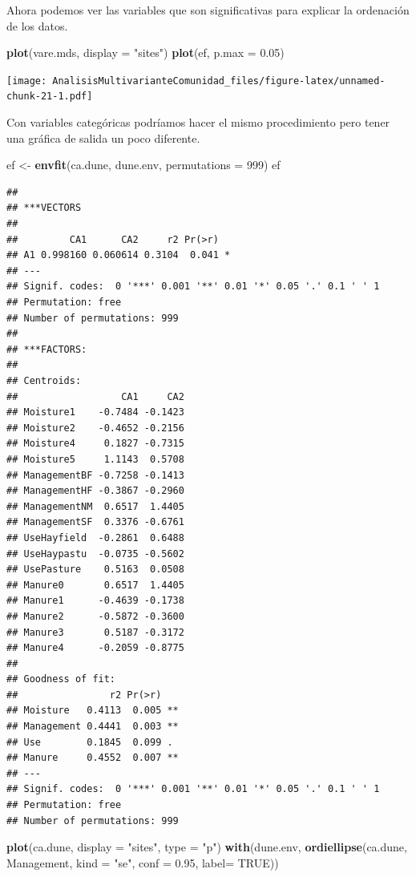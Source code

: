 \documentclass[]{book}
\newenvironment{Shaded}{\begin{snugshade}}{\end{snugshade}}
\newcommand{\KeywordTok}[1]{\textcolor[rgb]{0.13,0.29,0.53}{\textbf{{#1}}}}
\newcommand{\DataTypeTok}[1]{\textcolor[rgb]{0.13,0.29,0.53}{{#1}}}
\newcommand{\DecValTok}[1]{\textcolor[rgb]{0.00,0.00,0.81}{{#1}}}
\newcommand{\FloatTok}[1]{\textcolor[rgb]{0.00,0.00,0.81}{{#1}}}
\newcommand{\StringTok}[1]{\textcolor[rgb]{0.31,0.60,0.02}{{#1}}}
\newcommand{\OtherTok}[1]{\textcolor[rgb]{0.56,0.35,0.01}{{#1}}}
\newcommand{\NormalTok}[1]{{#1}}
\begin{document}
Ahora podemos ver las variables que son significativas para explicar la
ordenación de los datos.

\begin{Shaded}
\begin{Highlighting}[]
\KeywordTok{plot}\NormalTok{(vare.mds, }\DataTypeTok{display =} \StringTok{"sites"}\NormalTok{)}
\KeywordTok{plot}\NormalTok{(ef, }\DataTypeTok{p.max =} \FloatTok{0.05}\NormalTok{)}
\end{Highlighting}
\end{Shaded}

\texttt{[image: AnalisisMultivarianteComunidad\_files/figure-latex/unnamed-chunk-21-1.pdf]}

Con variables categóricas podríamos hacer el mismo procedimiento pero
tener una gráfica de salida un poco diferente.

\begin{Shaded}
\begin{Highlighting}[]
\NormalTok{ef <-}\StringTok{ }\KeywordTok{envfit}\NormalTok{(ca.dune, dune.env, }\DataTypeTok{permutations =} \DecValTok{999}\NormalTok{)}
\NormalTok{ef}
\end{Highlighting}
\end{Shaded}

\begin{verbatim}
## 
## ***VECTORS
## 
##         CA1      CA2     r2 Pr(>r)  
## A1 0.998160 0.060614 0.3104  0.041 *
## ---
## Signif. codes:  0 '***' 0.001 '**' 0.01 '*' 0.05 '.' 0.1 ' ' 1
## Permutation: free
## Number of permutations: 999
## 
## ***FACTORS:
## 
## Centroids:
##                  CA1     CA2
## Moisture1    -0.7484 -0.1423
## Moisture2    -0.4652 -0.2156
## Moisture4     0.1827 -0.7315
## Moisture5     1.1143  0.5708
## ManagementBF -0.7258 -0.1413
## ManagementHF -0.3867 -0.2960
## ManagementNM  0.6517  1.4405
## ManagementSF  0.3376 -0.6761
## UseHayfield  -0.2861  0.6488
## UseHaypastu  -0.0735 -0.5602
## UsePasture    0.5163  0.0508
## Manure0       0.6517  1.4405
## Manure1      -0.4639 -0.1738
## Manure2      -0.5872 -0.3600
## Manure3       0.5187 -0.3172
## Manure4      -0.2059 -0.8775
## 
## Goodness of fit:
##                r2 Pr(>r)   
## Moisture   0.4113  0.005 **
## Management 0.4441  0.003 **
## Use        0.1845  0.099 . 
## Manure     0.4552  0.007 **
## ---
## Signif. codes:  0 '***' 0.001 '**' 0.01 '*' 0.05 '.' 0.1 ' ' 1
## Permutation: free
## Number of permutations: 999
\end{verbatim}

\begin{Shaded}
\begin{Highlighting}[]
\KeywordTok{plot}\NormalTok{(ca.dune, }\DataTypeTok{display =} \StringTok{"sites"}\NormalTok{, }\DataTypeTok{type =} \StringTok{"p"}\NormalTok{)}
\KeywordTok{with}\NormalTok{(dune.env, }\KeywordTok{ordiellipse}\NormalTok{(ca.dune, Management, }\DataTypeTok{kind =} \StringTok{"se"}\NormalTok{, }\DataTypeTok{conf =} \FloatTok{0.95}\NormalTok{, }\DataTypeTok{label=} \OtherTok{TRUE}\NormalTok{))}
\end{Highlighting}
\end{Shaded}
\end{document}
